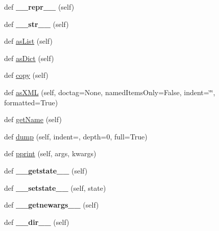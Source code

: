 \begin{DoxyCompactItemize}
def {\bfseries \+\_\+\+\_\+repr\+\_\+\+\_\+} (self)
\item 
\mbox{\label{classpkg__resources_1_1__vendor_1_1pyparsing_1_1_parse_results_a4a097cf222695437e65d56bd11c1bfb8}} 
def {\bfseries \+\_\+\+\_\+str\+\_\+\+\_\+} (self)
\item 
def \hyperlink{classpkg__resources_1_1__vendor_1_1pyparsing_1_1_parse_results_aa7e886aa0826871511b189660343f3aa}{as\+List} (self)
\item 
def \hyperlink{classpkg__resources_1_1__vendor_1_1pyparsing_1_1_parse_results_ab73f26af9e7cc95de6dbb0d54d7a81ba}{as\+Dict} (self)
\item 
def \hyperlink{classpkg__resources_1_1__vendor_1_1pyparsing_1_1_parse_results_a2a61c21c96962723ec37cbbec5f3e583}{copy} (self)
\item 
def \hyperlink{classpkg__resources_1_1__vendor_1_1pyparsing_1_1_parse_results_a5a6a33bef33c1cd43437358783fdffde}{as\+X\+ML} (self, doctag=None, named\+Items\+Only=False, indent=\char`\"{}\char`\"{}, formatted=True)
\item 
def \hyperlink{classpkg__resources_1_1__vendor_1_1pyparsing_1_1_parse_results_a84fe6f0686f055144e26c2102c535689}{get\+Name} (self)
\item 
def \hyperlink{classpkg__resources_1_1__vendor_1_1pyparsing_1_1_parse_results_a8ef896f3757488f88d385652f96e7b1b}{dump} (self, indent=\textquotesingle{}\textquotesingle{}, depth=0, full=True)
\item 
def \hyperlink{classpkg__resources_1_1__vendor_1_1pyparsing_1_1_parse_results_a584f4c008b1c702a394e8295d878edda}{pprint} (self, args, kwargs)
\item 
\mbox{\label{classpkg__resources_1_1__vendor_1_1pyparsing_1_1_parse_results_a594ea435abd4fde98a1c858c51e5e48b}} 
def {\bfseries \+\_\+\+\_\+getstate\+\_\+\+\_\+} (self)
\item 
\mbox{\label{classpkg__resources_1_1__vendor_1_1pyparsing_1_1_parse_results_a11faccdc68b6b5a93481319072b3eb9e}} 
def {\bfseries \+\_\+\+\_\+setstate\+\_\+\+\_\+} (self, state)
\item 
\mbox{\label{classpkg__resources_1_1__vendor_1_1pyparsing_1_1_parse_results_a956d41c88a658b500cf12c0c1782e4bc}} 
def {\bfseries \+\_\+\+\_\+getnewargs\+\_\+\+\_\+} (self)
\item 
\mbox{\label{classpkg__resources_1_1__vendor_1_1pyparsing_1_1_parse_results_acf4ab715aea2a0f33c0ecfb9d944aeee}} 
def {\bfseries \+\_\+\+\_\+dir\+\_\+\+\_\+} (self)
\end{DoxyCompactItemize}

